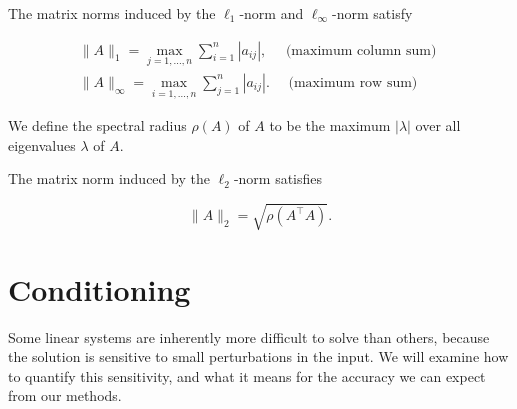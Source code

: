 \begin{theorem}
 The matrix norms induced by the \(\ell_1\)-norm and \(\ell_{\infty}\)-norm satisfy

\[
\begin{array}{r}
\|A\|_1=\max _{j=1, \ldots, n} \sum_{i=1}^n\left|a_{i j}\right|, \quad \text { (maximum column sum) } \\
\|A\|_{\infty}=\max _{i=1, \ldots, n} \sum_{j=1}^n\left|a_{i j}\right| . \quad \text { (maximum row sum) }
\end{array}
\] 
\end{theorem}

\begin{definition}
  We define the spectral radius \(\rho(A)\) of \(A\) to be the maximum \(|\lambda|\) over all eigenvalues \(\lambda\) of \(A\).
\end{definition}

\begin{theorem}
  The matrix norm induced by the \(\ell_2\)-norm satisfies

\[
\|A\|_2=\sqrt{\rho\left(A^{\top} A\right)} .
\]
\end{theorem}

\section{Conditioning}

\begin{remark}
  Some linear systems are inherently more difficult to solve than others, because the solution is sensitive to small perturbations in the input. We will examine how to quantify this sensitivity, and what it means for the accuracy we can expect from our methods.
\end{remark}

